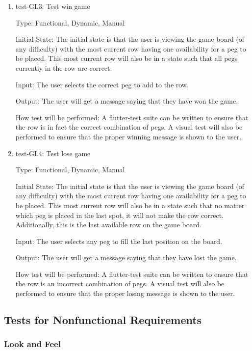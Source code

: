 \documentclass[12pt, titlepage]{article}
\begin{document}
\begin{enumerate}
\item{test-GL3: Test win game\\}

Type: Functional, Dynamic, Manual
					
Initial State: The  initial  state  is  that  the  user  is  viewing  the  game board (of any difficulty) with the most current row having one availability for a peg to be placed. This most current row will also be in a state such that all pegs currently in the row are correct.
					
Input: The user selects the correct peg to add to the row.
					
Output: The user will get a message saying that they have won the game.
					
How test will be performed: A flutter-test suite can be written to ensure that the row is in fact the correct combination of pegs. A visual test will also be performed to ensure that the proper winning message is shown to the user.

\item{test-GL4: Test lose game\\}

Type: Functional, Dynamic, Manual
					
Initial State: The  initial  state  is  that  the  user  is  viewing  the  game board (of any difficulty) with the most current row having one availability for a peg to be placed. This most current row will also be in a state such that no matter which peg is placed in the last spot, it will not make the row correct. Additionally, this is the last available row on the game board.
					
Input: The user selects any peg to fill the last position on the board.
					
Output: The user will get a message saying that they have lost the game.
					
How test will be performed: A flutter-test suite can be written to ensure that the row is an incorrect combination of pegs. A visual test will also be performed to ensure that the proper losing message is shown to the user.

\end{enumerate}


\subsection{Tests for Nonfunctional Requirements}

\subsubsection{Look and Feel}
\end{document}
